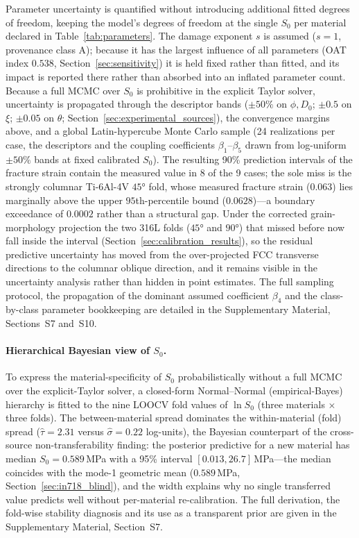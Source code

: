 \label{sec:uncertainty}Parameter uncertainty is quantified without introducing additional fitted degrees of freedom, keeping the model's degrees of freedom at the single $S_0$ per material declared in Table~\ref{tab:parameters}. The damage exponent $s$ is assumed ($s=1$, provenance class A); because it has the largest influence of all parameters (OAT index $0.538$, Section~\ref{sec:sensitivity}) it is held fixed rather than fitted, and its impact is reported there rather than absorbed into an inflated parameter count. Because a full MCMC over $S_0$ is prohibitive in the explicit Taylor solver, uncertainty is propagated through the descriptor bands ($\pm50\%$ on $\phi,D_0$; $\pm0.5$ on $\xi$; $\pm0.05$ on $\theta$; Section~\ref{sec:experimental_sources}), the convergence margins above, and a global Latin-hypercube Monte Carlo sample (24 realizations per case, the descriptors and the coupling coefficients $\beta_1$--$\beta_5$ drawn from log-uniform $\pm50\%$ bands at fixed calibrated $S_0$). The resulting 90\% prediction intervals of the fracture strain contain the measured value in 8 of the 9 cases; the sole miss is the strongly columnar Ti-6Al-4V $\ang{45}$ fold, whose measured fracture strain ($0.063$) lies marginally above the upper $95$th-percentile bound ($0.0628$)---a boundary exceedance of $0.0002$ rather than a structural gap. Under the corrected grain-morphology projection the two 316L folds ($\ang{45}$ and $\ang{90}$) that missed before now fall inside the interval (Section~\ref{sec:calibration_results}), so the residual predictive uncertainty has moved from the over-projected FCC transverse directions to the columnar oblique direction, and it remains visible in the uncertainty analysis rather than hidden in point estimates. The full sampling protocol, the propagation of the dominant assumed coefficient $\beta_4$ and the class-by-class parameter bookkeeping are detailed in the Supplementary Material, Sections~S7 and~S10.

\paragraph{Hierarchical Bayesian view of $S_0$.}
To express the material-specificity of $S_0$ probabilistically without a full MCMC over the explicit-Taylor solver, a closed-form Normal--Normal (empirical-Bayes) hierarchy is fitted to the nine LOOCV fold values of $\ln S_0$ (three materials $\times$ three folds). The between-material spread dominates the within-material (fold) spread ($\hat\tau = 2.31$ versus $\hat\sigma = 0.22$ log-units), the Bayesian counterpart of the cross-source non-transferability finding: the posterior predictive for a new material has median $S_0 = 0.589$\,MPa with a 95\% interval $[0.013, 26.7]$\,MPa---the median coincides with the mode-1 geometric mean ($0.589$\,MPa, Section~\ref{sec:in718_blind}), and the width explains why no single transferred value predicts well without per-material re-calibration. The full derivation, the fold-wise stability diagnosis and its use as a transparent prior are given in the Supplementary Material, Section~S7.

